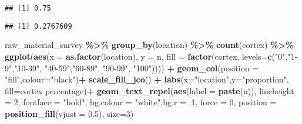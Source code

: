 \documentclass[
]{article}
\newenvironment{Shaded}{\begin{snugshade}}{\end{snugshade}}
\newcommand{\AttributeTok}[1]{\textcolor[rgb]{0.13,0.29,0.53}{#1}}
\newcommand{\DecValTok}[1]{\textcolor[rgb]{0.00,0.00,0.81}{#1}}
\newcommand{\FloatTok}[1]{\textcolor[rgb]{0.00,0.00,0.81}{#1}}
\newcommand{\FunctionTok}[1]{\textcolor[rgb]{0.13,0.29,0.53}{\textbf{#1}}}
\newcommand{\NormalTok}[1]{#1}
\newcommand{\SpecialCharTok}[1]{\textcolor[rgb]{0.81,0.36,0.00}{\textbf{#1}}}
\newcommand{\StringTok}[1]{\textcolor[rgb]{0.31,0.60,0.02}{#1}}
\begin{document}
\begin{Shaded}
\end{Shaded}

\begin{verbatim}
## [1] 0.75
\end{verbatim}

\begin{Shaded}
\end{Shaded}

\begin{verbatim}
## [1] 0.2767609
\end{verbatim}

\begin{Shaded}
\begin{Highlighting}[]
\NormalTok{raw\_material\_survey }\SpecialCharTok{\%\textgreater{}\%}
  \FunctionTok{group\_by}\NormalTok{(location) }\SpecialCharTok{\%\textgreater{}\%}
  \FunctionTok{count}\NormalTok{(cortex) }\SpecialCharTok{\%\textgreater{}\%}
  \FunctionTok{ggplot}\NormalTok{(}\FunctionTok{aes}\NormalTok{(}\AttributeTok{x =} \FunctionTok{as.factor}\NormalTok{(location), }\AttributeTok{y =}\NormalTok{ n, }\AttributeTok{fill =} \FunctionTok{factor}\NormalTok{(cortex, }\AttributeTok{levels=}\FunctionTok{c}\NormalTok{(}\StringTok{"0"}\NormalTok{,}\StringTok{"1{-}9"}\NormalTok{,}\StringTok{"10{-}39"}\NormalTok{, }\StringTok{"40{-}59"}\NormalTok{,}\StringTok{"60{-}89"}\NormalTok{, }\StringTok{"90{-}99"}\NormalTok{, }\StringTok{"100"}\NormalTok{)))) }\SpecialCharTok{+}
  \FunctionTok{geom\_col}\NormalTok{(}\AttributeTok{position =} \StringTok{"fill"}\NormalTok{,}\AttributeTok{colour=}\StringTok{"black"}\NormalTok{)}\SpecialCharTok{+}
  \FunctionTok{scale\_fill\_jco}\NormalTok{() }\SpecialCharTok{+}
  \FunctionTok{labs}\NormalTok{(}\AttributeTok{x=}\StringTok{"location"}\NormalTok{,}\AttributeTok{y=}\StringTok{"proportion"}\NormalTok{, }\AttributeTok{fill=}\StringTok{\textquotesingle{}cortex percentage\textquotesingle{}}\NormalTok{)}\SpecialCharTok{+}
  \FunctionTok{geom\_text\_repel}\NormalTok{(}\FunctionTok{aes}\NormalTok{(}\AttributeTok{label =} \FunctionTok{paste}\NormalTok{(n)), }
                \AttributeTok{lineheight =} \DecValTok{2}\NormalTok{,}
            \AttributeTok{fontface =} \StringTok{"bold"}\NormalTok{, }\AttributeTok{bg.colour =} \StringTok{"white"}\NormalTok{,}\AttributeTok{bg.r =}\NormalTok{ .}\DecValTok{1}\NormalTok{, }\AttributeTok{force =} \DecValTok{0}\NormalTok{,}
                \AttributeTok{position =} \FunctionTok{position\_fill}\NormalTok{(}\AttributeTok{vjust =} \FloatTok{0.5}\NormalTok{), }\AttributeTok{size=}\DecValTok{3}\NormalTok{)}
\end{Highlighting}
\end{Shaded}
\end{document}
